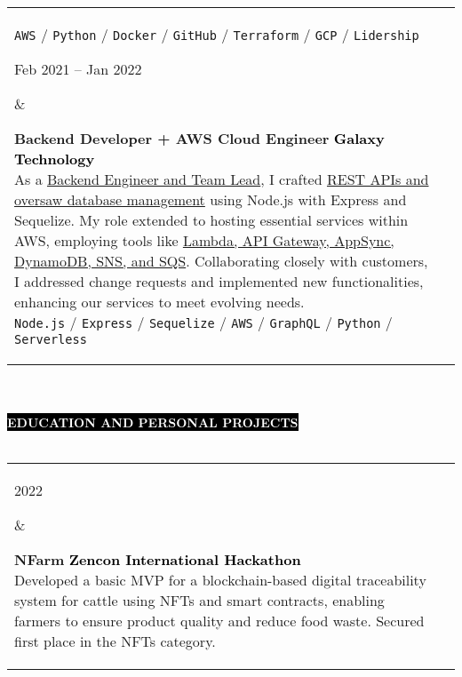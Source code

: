 \documentclass[10pt,A4]{article}
\makeatletter
\newcounter{a}
\newcounter{b}
\newcounter{c}
\newcommand{\cvsection}[1] {
	\textcolor{white}{\MakeUppercase{\textbf{#1}}}
}
\newcommand{\cvsect}[1]{
	\colorbox{black}{{\cvsection{#1}}}\\\\%
}
\newenvironment{entrylist}{%
	\begin{tabular*}{\textwidth}[t]{@{\extracolsep{\fill}}ll}
	}{%
	\end{tabular*}
}
\newcommand{\entry}[4]{%
	\parbox[t]{3.5cm}{%
		#1%
	}%
	&\parbox[t]{14cm}{%
		\textbf{#2}%
		\hfill%
		{\footnotesize \textbf{\textcolor{black}{#3}}}\\%
		#4%
	}\\\\}
\newcommand{\slashsep}{
	\hspace{2mm}/\hspace{2mm}
}
\makeatother
\begin{document}
\begin{entrylist}
{			\texttt{AWS}\slashsep\texttt{Python}\slashsep\texttt{Docker}\slashsep\texttt{GitHub}\slashsep\texttt{Terraform}\slashsep\texttt{GCP}\slashsep\texttt{Lidership}}
		\entry
		{Feb 2021 – Jan 2022}
		{Backend Developer + AWS Cloud Engineer}
		{Galaxy Technology}
		{As a \underline{Backend Engineer and Team Lead}, I crafted \underline{REST APIs and oversaw database
		management} using Node.js with Express and Sequelize. My role extended to hosting
		essential services within AWS, employing tools like \underline{Lambda, API Gateway,
		AppSync, DynamoDB, SNS, and SQS}. Collaborating closely with customers, I addressed
		change requests and implemented new functionalities, enhancing our services to
		meet evolving needs.\\
			\texttt{Node.js}\slashsep\texttt{Express}\slashsep\texttt{Sequelize}\slashsep\texttt{AWS}\slashsep\texttt{GraphQL}\slashsep\texttt{Python}\slashsep\texttt{Serverless}}
	\end{entrylist}
	\\\\


	\cvsect{Education and Personal Projects}
	\begin{entrylist}
		\entry
		{2022}
		{NFarm}
		{Zencon International Hackathon}
		{Developed a basic MVP for a blockchain-based digital traceability system for cattle using NFTs
		and smart contracts, enabling farmers to ensure product quality and reduce food waste. Secured
		first place in the NFTs category.}
		\entry
		{2019}
		{Lung Cancer Detection System with AI - Damai}
		{Expo Science International}
		{Developed an MVP system using Convolutional Neural Networks and image processing to detect lung
		cancer in its early stages.Selected as one of the top 100 projects representing Mexico at Expo
		Science International in Abu Dhabi, UAE.}
		\entry
		{2017 – 2020}
		{Software Engineering}
		{Universidad Politécnica de Durango (UNIPOLI)}
		{Graduated with a 9.42 score.}
	\end{entrylist}%
	\\\\

\end{document}
